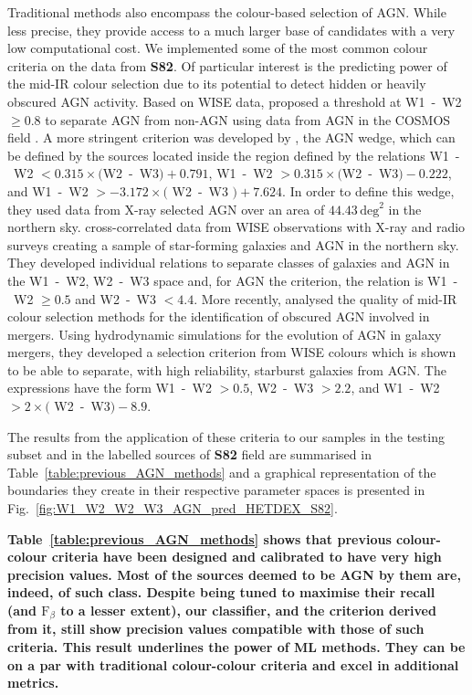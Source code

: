\documentclass{aa}
\begin{document}
Traditional methods also encompass the colour-based selection of AGN. While less precise, they provide access to a much larger base of candidates with a very low computational cost. We implemented some of the most common colour criteria on the data from \textbf{S82}.
Of particular interest is the predicting power of the mid-IR colour selection due to its potential to detect hidden or heavily obscured AGN activity. 
 Based on WISE \citep{2010AJ....140.1868W} data, \citet[][S12]{2012ApJ...753...30S} proposed a threshold at W1~-~W2 $\geq 0.8$ to separate AGN from non-AGN using data from AGN in the COSMOS field \citep{2007ApJS..172....1S}.
A more stringent criterion was developed by \citet[][M12]{2012MNRAS.426.3271M}, the AGN wedge, which can be defined by the sources located inside the region defined by the relations W1~-~W2 $< 0.315 \times($W2~-~W3$)+ 0.791$, W1~-~W2 $> 0.315 \times($W2~-~W3$)- 0.222$, and W1~-~W2 $> -3.172 \times($ W2~-~W3 $)+ 7.624$. In order to define this wedge, they used data from X-ray selected AGN over an area of $44.43\, \mathrm{deg}^{2}$ in the northern sky.
\citet[][M16]{2016MNRAS.462.2631M} cross-correlated data from WISE observations with X-ray and radio surveys creating a sample of star-forming galaxies and AGN in the northern sky. They developed individual relations to separate classes of galaxies and AGN in the W1~-~W2, W2~-~W3 space and, for AGN the criterion, the relation is  W1~-~W2 $\geq 0.5$ and W2~-~W3 $< 4.4$.
More recently, \citet[][B18]{2018MNRAS.478.3056B} analysed the quality of mid-IR colour selection methods for the identification of obscured AGN involved in mergers. Using hydrodynamic simulations for the evolution of AGN in galaxy mergers, they developed a selection criterion from WISE colours which is shown to be able to separate, with high reliability, starburst galaxies from AGN. The expressions have the form W1~-~W2 $> 0.5$, W2~-~W3 $> 2.2$, and W1~-~W2 $> 2 \times($ W2~-~W3$) -8.9$.

The results from the application of these criteria to our samples in the testing subset and in the labelled sources of \textbf{S82} field are summarised in Table~\ref{table:previous_AGN_methods} and a graphical representation of the boundaries they create in their respective parameter spaces is presented in Fig.~\ref{fig:W1_W2_W2_W3_AGN_pred_HETDEX_S82}. 

\textbf{Table~\ref{table:previous_AGN_methods} shows that previous colour-colour criteria have been designed and calibrated to have very high precision values. Most of the sources deemed to be AGN by them are, indeed, of such class. Despite being tuned to maximise their recall (and $\mathrm{F}_{\beta}$ to a lesser extent), our classifier, and the criterion derived from it, still show precision values compatible with those of such criteria. This result underlines the power of ML methods. They can be on a par with traditional colour-colour criteria and excel in additional metrics.}
\end{document}
